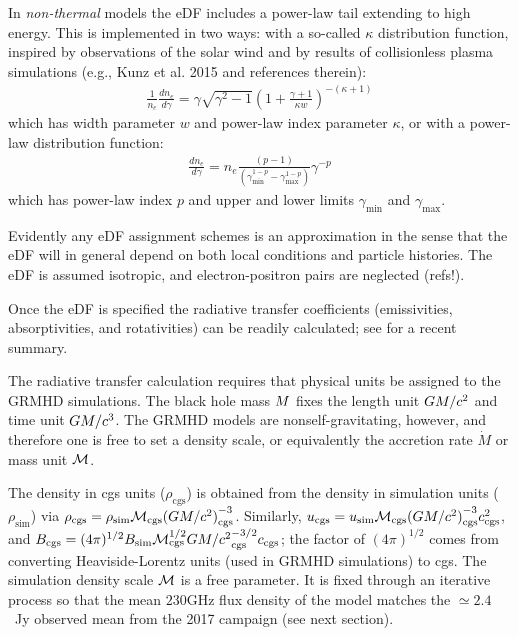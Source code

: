 In {\it non-thermal} models the eDF includes a power-law tail extending to high energy.
This is implemented in two ways: with a so-called $\kappa$ distribution function, inspired by observations of the solar wind and by results of
collisionless plasma simulations (e.g., Kunz et al. 2015 and references therein):
\begin{align}
  \frac{1}{n_e} \frac{d n_e}{d\gamma}= \gamma \sqrt{\gamma^2-1} \left(1+\frac{\gamma+1}{\kappa w}\right)^{-(\kappa+1)}
\end{align}
which has width parameter $w$ and power-law index parameter $\kappa$, or with a power-law distribution function:
\begin{align}
  \frac{d n_e}{d\gamma} = n_e \frac{ (p-1)}{(\gamma_{\min}^{1-p} - \gamma_{\max}^{1-p})} \gamma^{-p}
\end{align}
which has power-law index $p$ and upper and lower limits  $\gamma_{\min}$ and $\gamma_{\max}$.

Evidently any eDF assignment schemes is an approximation in the sense that the eDF will in general depend on both local conditions and particle histories.  The eDF is assumed isotropic, and electron-positron pairs are neglected (refs!).

Once the eDF is specified the radiative transfer coefficients (emissivities, absorptivities, and rotativities) can be readily calculated; see \cite{2021ApJ...921...17M} for a recent summary.



The radiative transfer calculation requires that physical units be assigned to the GRMHD simulations.  The black hole mass $M$ fixes the length unit $GM/c^2$ and time unit $GM/c^3$.  The GRMHD models are nonself-gravitating, however, and therefore one is free to set a density scale, or equivalently the accretion rate $\dot{M}$ or mass unit $\mathcal{M}$.

The density in cgs units ($\rho_\mathrm{cgs}$) is obtained from the density  in simulation units ($\rho_\mathrm{sim}$) via $\rho_\mathrm{cgs} = \rho_\mathrm{sim} \mathcal{M}_\mathrm{cgs} {(GM/c^2)}_\mathrm{cgs}^{-3}$.  Similarly, $u_\mathrm{cgs} = u_\mathrm{sim} \mathcal{M}_\mathrm{cgs} {(GM/c^2)}_\mathrm{cgs}^{-3} c_\mathrm{cgs}^2$, and $B_\mathrm{cgs} = (4\pi)^{1/2} B_\mathrm{sim} \mathcal{M}_\mathrm{cgs}^{1/2} {GM/c^2}_\mathrm{cgs}^{-3/2} c_\mathrm{cgs}$; the factor of $(4\pi)^{1/2}$ comes from converting Heaviside-Lorentz units (used in GRMHD simulations) to cgs.
The simulation density scale $\mathcal{M}$ is a free parameter.  It is fixed through an iterative process so that the mean $230$GHz flux density of the model matches the $\simeq 2.4$~Jy observed mean from the 2017 campaign (see next section).


